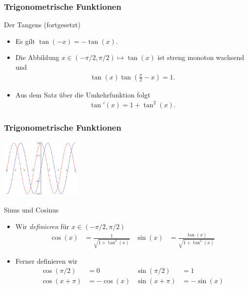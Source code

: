 \documentclass{beamer}
\renewcommand{\emph}[1]{{\textcolor{solarizedRed}{\itshape #1}}}
\newcommand\bc[1]{\left({#1}\right)}
\newcommand{\ue}{\"u}
\newcommand{\mytitle}{Trigonometrische Funktionen}
\begin{document}
\begin{frame}\frametitle{\mytitle}
	\begin{block}{Der Tangens (fortgesetzt)}
		\begin{itemize}
			\item Es gilt $\tan(-x)=-\tan(x)$.
			\item Die Abbildung $x\in(-\pi/2,\pi/2)\mapsto\tan(x)$ ist streng monoton wachsend und
				\begin{align*}
					\tan(x)\tan\bc{\frac{\pi}{2}-x}=1.
				\end{align*}
			\item Aus dem Satz \ue ber die Umkehrfunktion folgt
				\begin{align*}
					\tan'(x)=1+\tan^2(x).
				\end{align*}
		\end{itemize}
	\end{block}
\end{frame}

\begin{frame}\frametitle{\mytitle}
	\hfill\includegraphics[height=30mm]{pics/plot_sincos.pdf}
	\begin{block}{Sinus und Cosinus}
		\begin{itemize}
			\item Wir \emph{definieren} f\ue r $x\in(-\pi/2,\pi/2)$
				\begin{align*}
					\cos(x)&=\frac{1}{\sqrt{1+\tan^2(x)}}&
						\sin(x)&=\frac{\tan(x)}{\sqrt{1+\tan^2(x)}}
				\end{align*}
			\item Ferner definieren wir
				\begin{align*}
					\cos(\pi/2)&=0&\sin(\pi/2)&=1\\
					\cos(x+\pi)&=-\cos(x)&\sin(x+\pi)&=-\sin(x)
				\end{align*}
		\end{itemize}
	\end{block}
\end{frame}
\end{document}
